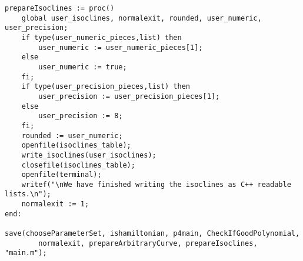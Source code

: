 \documentclass[a4paper,10pt]{article}
\begin{document}
\begin{lstlisting}[name=main]
prepareIsoclines := proc()
    global user_isoclines, normalexit, rounded, user_numeric, user_precision;
    if type(user_numeric_pieces,list) then
        user_numeric := user_numeric_pieces[1];
    else
        user_numeric := true;
    fi;
    if type(user_precision_pieces,list) then
        user_precision := user_precision_pieces[1];
    else
        user_precision := 8;
    fi;
    rounded := user_numeric;
    openfile(isoclines_table);
    write_isoclines(user_isoclines);
    closefile(isoclines_table);
    openfile(terminal);
    writef("\nWe have finished writing the isoclines as C++ readable lists.\n");
    normalexit := 1;
end:

save(chooseParameterSet, ishamiltonian, p4main, CheckIfGoodPolynomial,
        normalexit, prepareArbitraryCurve, prepareIsoclines, "main.m");


\end{lstlisting}
\end{document}
